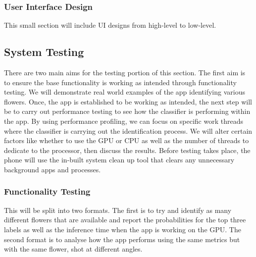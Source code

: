 \documentclass{article}
\begin{document}
\subsubsection{User Interface Design}

This small section will include UI designs from high-level to low-level.


\subsection{System Testing}

There are two main aims for the testing portion of this section. The first aim is to ensure the base 
functionality is working as intended through functionality testing. We will demonstrate real world examples of the app 
identifying various flowers. Once, the app is established to be working as intended, the next step will be to carry out 
performance testing to see how the classifier is performing within the app. By using performance profiling, we can focus
on specific work threads where the classifier is carrying out the identification process. We will alter certain factors 
like whether to use the GPU or CPU as well as the number of threads to dedicate to the processor, then discuss the 
results. Before testing takes place, the phone will use the in-built system clean up tool that clears any unnecessary 
background apps and processes.

\subsubsection{Functionality Testing}

This will be split into two formats. The first is to try and identify as many different flowers that are available 
and report the probabilities for the top three labels as well as the inference time when the app is working on the GPU. 
The second format is to analyse how the app performs using the same metrics but with the same flower, shot at different 
angles.
\end{document}
